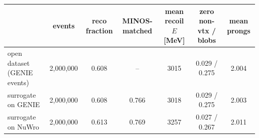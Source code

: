 \begin{tabular}{lcccccc}
\toprule
 & events & reco fraction & MINOS-matched & mean recoil $E$ [MeV] & zero non-vtx / blobs & mean prongs \\
\midrule
open dataset (GENIE events) & 2,000,000 & 0.608 & -- & 3015 & 0.029 / 0.275 & 2.004 \\
surrogate on GENIE & 2,000,000 & 0.608 & 0.766 & 3018 & 0.029 / 0.275 & 2.003 \\
surrogate on NuWro & 2,000,000 & 0.613 & 0.769 & 3257 & 0.027 / 0.267 & 2.011 \\
\bottomrule
\end{tabular}
